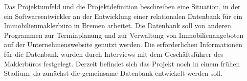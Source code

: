 
Das Projektumfeld und die Projektdefinition beschreiben eine Situation, in der ein Softwareentwickler an der
Entwicklung einer relationalen Datenbank für ein Immobilienmaklerbüro in Bremen arbeitet. Die Datenbank soll von anderen Programmen zur Terminplanung und zur Verwaltung von Immobilienangeboten auf der Unternehmenswebsite genutzt werden. Die erforderlichen Informationen für die Datenbank wurden durch Interviews mit dem Geschäftsführer des Maklerbüros festgelegt. Derzeit befindet sich das Projekt noch in einem frühen Stadium, da zunächst die gemeinsame Datenbank entwickelt werden soll.
